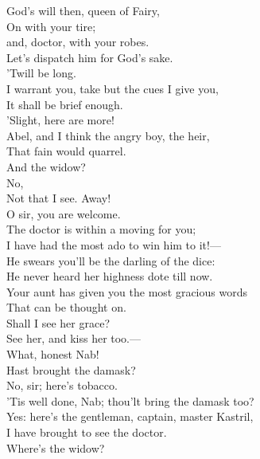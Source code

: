 \documentclass[a4paper,oneside]{memoir}
\begin{document}
\begin{drama*}
\facespeaks {} God's will then, queen of Fairy,\\
On with your tire;\\
and, doctor, with your robes.\\
Let's dispatch him for God's sake.\\
\subtlespeaks {} 'Twill be long.\\
\facespeaks I warrant you, take but the cues I give you,\\
It shall be brief enough.\\
'Slight, here are more!\\
Abel, and I think the angry boy, the heir,\\
That fain would quarrel.\\
\subtlespeaks {} And the widow?\\
\facespeaks {} No,\\
Not that I see. Away!\\
O sir, you are welcome.\\
The doctor is within a moving for you;\\
I have had the most ado to win him to it!---\\
He swears you'll be the darling of the dice:\\
He never heard her highness dote till now.\\
Your aunt has given you the most gracious words\\
That can be thought on.\\
\dapperspeaks {} Shall I see her grace?\\
\facespeaks See her, and kiss her too.---\\
What, honest Nab!\\
Hast brought the damask?\\
\druggerspeaks {} No, sir; here's tobacco.\\
\facespeaks 'Tis well done, Nab; thou'lt bring the damask too?\\
\druggerspeaks Yes: here's the gentleman, captain, master Kastril,\\
I have brought to see the doctor.\\
\facespeaks {} Where's the widow?\\

\end{drama*}
\end{document}
